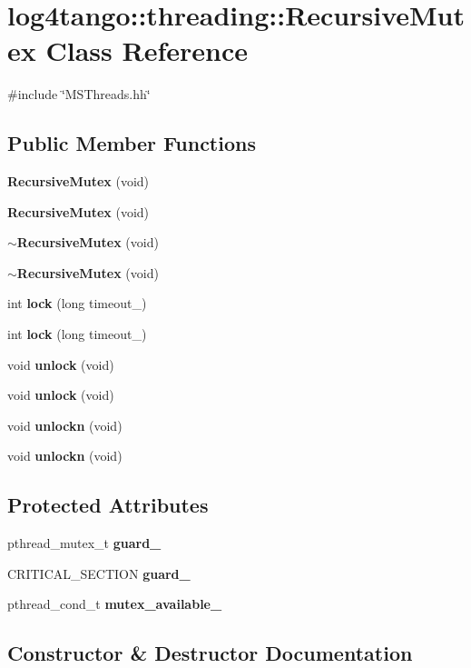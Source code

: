 \section{log4tango\-:\-:threading\-:\-:Recursive\-Mutex Class Reference}
\label{classlog4tango_1_1threading_1_1RecursiveMutex}


{\ttfamily \#include \char`\"{}M\-S\-Threads.\-hh\char`\"{}}

\subsection*{Public Member Functions}
\begin{DoxyCompactItemize}
\item 
{\bf Recursive\-Mutex} (void)
\item 
{\bf Recursive\-Mutex} (void)
\item 
{\bf $\sim$\-Recursive\-Mutex} (void)
\item 
{\bf $\sim$\-Recursive\-Mutex} (void)
\item 
int {\bf lock} (long timeout\-\_)
\item 
int {\bf lock} (long timeout\-\_)
\item 
void {\bf unlock} (void)
\item 
void {\bf unlock} (void)
\item 
void {\bf unlockn} (void)
\item 
void {\bf unlockn} (void)
\end{DoxyCompactItemize}
\subsection*{Protected Attributes}
\begin{DoxyCompactItemize}
\item 
pthread\-\_\-mutex\-\_\-t {\bf guard\-\_\-}
\item 
C\-R\-I\-T\-I\-C\-A\-L\-\_\-\-S\-E\-C\-T\-I\-O\-N {\bf guard\-\_\-}
\item 
pthread\-\_\-cond\-\_\-t {\bf mutex\-\_\-available\-\_\-}
\end{DoxyCompactItemize}


\subsection{Constructor \& Destructor Documentation}
